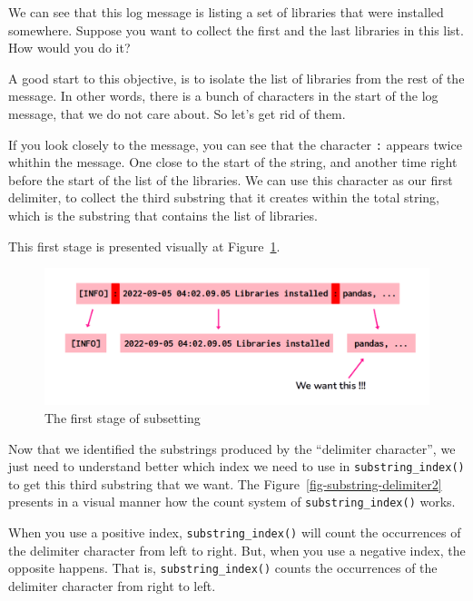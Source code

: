\documentclass[
  11pt,
  letterpaper,
  DIV=11,
  numbers=noendperiod]{scrreprt}
\begin{document}
We can see that this log message is listing a set of libraries that were
installed somewhere. Suppose you want to collect the first and the last
libraries in this list. How would you do it?

A good start to this objective, is to isolate the list of libraries from
the rest of the message. In other words, there is a bunch of characters
in the start of the log message, that we do not care about. So let's get
rid of them.

If you look closely to the message, you can see that the character
\texttt{:} appears twice whithin the message. One close to the start of
the string, and another time right before the start of the list of the
libraries. We can use this character as our first delimiter, to collect
the third substring that it creates within the total string, which is
the substring that contains the list of libraries.

This first stage is presented visually at
Figure~\ref{fig-substring-delimiter1}.

\begin{figure}

{\centering \includegraphics{Chapters/./../Figures/substring-delimiter1.png}

}

\caption{\label{fig-substring-delimiter1}The first stage of subsetting}

\end{figure}

Now that we identified the substrings produced by the ``delimiter
character'', we just need to understand better which index we need to
use in \texttt{substring\_index()} to get this third substring that we
want. The Figure~\ref{fig-substring-delimiter2} presents in a visual
manner how the count system of \texttt{substring\_index()} works.

When you use a positive index, \texttt{substring\_index()} will count
the occurrences of the delimiter character from left to right. But, when
you use a negative index, the opposite happens. That is,
\texttt{substring\_index()} counts the occurrences of the delimiter
character from right to left.
\end{document}

